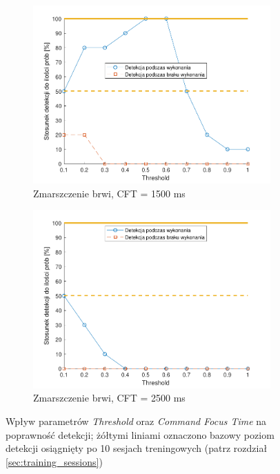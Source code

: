 \documentclass[skorowidz,skroty]{dyplomWEZUT}
\begin{document}
\begin{figure}
    \medskip
    \begin{subfigure}{0.49\textwidth}
    \includegraphics[width=\linewidth]{graphic/frown1500}
    \caption{Zmarszczenie brwi, CFT = 1500 ms\label{fig:frown1500}}
    \end{subfigure}\hspace*{\fill}
    \begin{subfigure}{0.49\textwidth}
    \includegraphics[width=\linewidth]{graphic/frown2500}
    \caption{Zmarszczenie brwi, CFT = 2500 ms\label{fig:frown2500}}
    \end{subfigure}
    
    \caption[Wpływ parametrów \textit{Threshold} oraz \textit{Command Focus Time} na poprawność detekcji]{Wpływ parametrów \textit{Threshold} oraz \textit{Command Focus Time} na poprawność detekcji; żółtymi liniami oznaczono bazowy poziom detekcji osiągnięty po 10 sesjach treningowych (patrz rozdział \vref{sec:training_sessions}) \label{fig:parameter}}
\end{figure}
\end{document}
